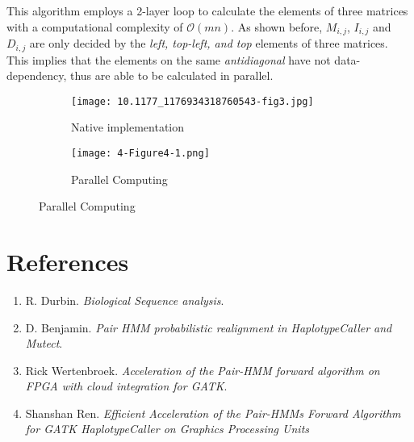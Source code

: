 \documentclass{article}
\begin{document}
This algorithm employs a 2-layer loop to calculate the elements of three matrices with a computational complexity of $\mathcal{O}(mn)$. As shown before, $M_{i,j}$, $I_{i,j}$ and $D_{i,j}$ are only decided by the \emph{left, top-left, \emph{and} top} elements of three matrices. This implies that the elements on the same \emph{antidiagonal} have not data-dependency, thus are able to be calculated in parallel.\\

\begin{figure}[h]
    \centering
    \begin{subfigure}{.5\textwidth}
        \centering
        \texttt{[image: 10.1177\_1176934318760543-fig3.jpg]}
        \caption{Native implementation}
        \label{fig:sub1}
    \end{subfigure}%
    \begin{subfigure}{.5\textwidth}
        \centering
        \texttt{[image: 4-Figure4-1.png]}
        \caption{Parallel Computing}
        \label{fig:sub2}
    \end{subfigure}
\end{figure}

\vfill

\section{References}

\begin{enumerate}
    \item R. Durbin. \emph{Biological Sequence analysis}.
    \item D. Benjamin. \emph{Pair HMM probabilistic realignment in HaplotypeCaller and Mutect}.
    \item Rick Wertenbroek. \emph{Acceleration of the Pair-HMM forward algorithm on FPGA with cloud integration for GATK}.
    \item Shanshan Ren. \emph{Efficient Acceleration of the Pair-HMMs Forward Algorithm for GATK HaplotypeCaller on Graphics Processing Units}
\end{enumerate}
\end{document}
